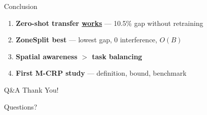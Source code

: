 \documentclass[aspectratio=169,11pt]{beamer}
\begin{document}
\begin{frame}{Conclusion}
\begin{enumerate}
    \item \textbf{Zero-shot transfer \underline{works}} — 10.5\% gap without retraining
    \item \textbf{ZoneSplit best} — lowest gap, 0 interference, $O(B)$
    \item \textbf{Spatial awareness $>$ task balancing} 
    \item \textbf{First M-CRP study} — definition, bound, benchmark
\end{enumerate}

\vspace{0.5cm}
\centering
{}
\end{frame}

\begin{frame}{Q\&A}
\centering
\vspace{1cm}
{\Huge Thank You!}
\vspace{0.5cm}

\Large Questions?
\end{frame}
\end{document}
